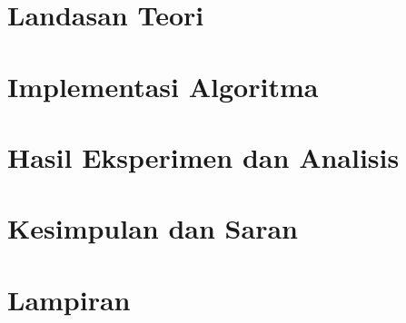 \documentclass[10pt,a4paper]{report}
\begin{document}
\chapter{Landasan Teori}


\chapter{Implementasi Algoritma}


\chapter{Hasil Eksperimen dan Analisis}


\chapter{Kesimpulan dan Saran}


\chapter{Lampiran}



\nocite{*}

\end{document}
